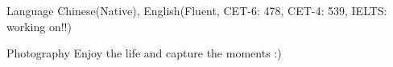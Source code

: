 

\begin{cvskills}
	
\cvskill
{Language} %
{Chinese(Native), English(Fluent, CET-6: 478, CET-4: 539, IELTS: working on!!)} %

\cvskill
{Photography} %
{Enjoy the life and capture the moments :)} %


\end{cvskills}
